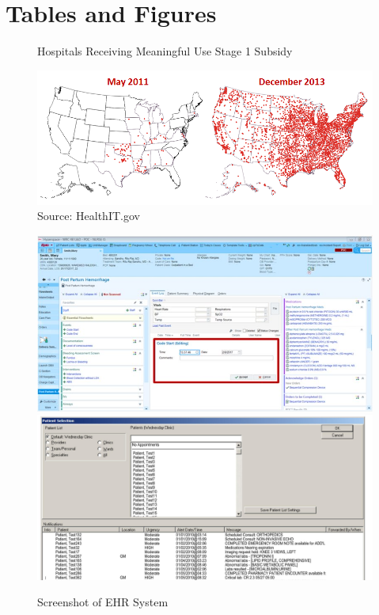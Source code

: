 \documentclass[11pt]{article}
\begin{document}
\section{Tables and Figures}

\begin{figure}[htp]
    \centering
    \caption{Hospitals Receiving Meaningful Use Stage 1 Subsidy}
    \includegraphics[scale=.6]{Objects/QS-Hospitals-Receiving-Payments-for-MU-and-Adoption.png}
    \caption*{Source: HealthIT.gov}
    \label{fig:meanuse}
\end{figure}

\begin{figure}[htp]
    \centering
    \caption{Screenshot of EHR System}
    \includegraphics[scale=.5]{Objects/epic-ehr-screenshot.jpg}
    \includegraphics[scale=.135]{Objects/EHRimage2.jpg}
    \label{fig:EPIC}
\end{figure}
\end{document}
